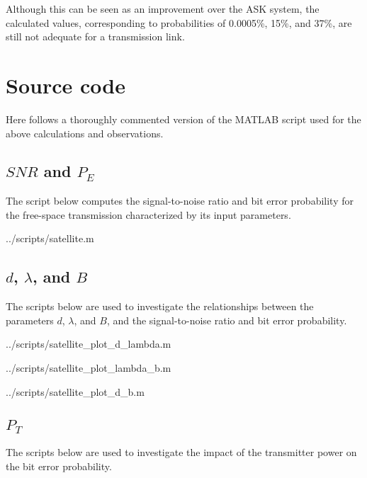 Although this can be seen as an improvement over the ASK system, the calculated values, corresponding to probabilities of 0.0005\%, 15\%, and 37\%, are still not adequate for a transmission link.

\lstset{
  caption=\lstname
}

\section{Source code}
Here follows a thoroughly commented version of the MATLAB script used for the above calculations and observations.

\subsection{$SNR$ and $P_E$}
The script below computes the signal-to-noise ratio and bit error probability for the free-space transmission characterized by its input parameters.

\begin{lstinputlisting}[language=Octave]{../scripts/satellite.m}
\end{lstinputlisting}


\subsection{$d$, $\lambda$, and $B$}
The scripts below are used to investigate the relationships between the parameters $d$, $\lambda$, and $B$, and the signal-to-noise ratio and bit error probability.

\begin{lstinputlisting}[language=Octave]{../scripts/satellite_plot_d_lambda.m}
\end{lstinputlisting}

\begin{lstinputlisting}[language=Octave]{../scripts/satellite_plot_lambda_b.m}
\end{lstinputlisting}

\begin{lstinputlisting}[language=Octave]{../scripts/satellite_plot_d_b.m}
\end{lstinputlisting}


\subsection{$P_T$}
The scripts below are used to investigate the impact of the transmitter power on the bit error probability.

